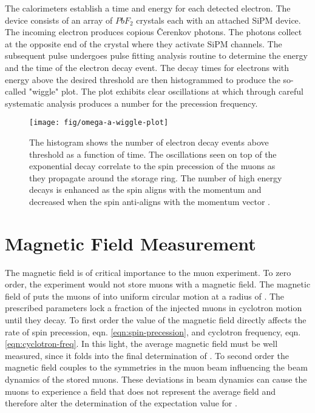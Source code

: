 The calorimeters establish a time and energy for each detected electron.  The device consists of an array of $PbF_2$ crystals each with an attached SiPM device.  The incoming electron produces copious \v{C}erenkov photons.  The photons collect at the opposite end of the crystal where they activate SiPM channels.  The subsequent pulse undergoes pulse fitting analysis routine to determine the energy and the time of the electron decay event.  The decay times for electrons with energy above the desired threshold are then histogrammed to produce the so-called "wiggle" plot.  The plot exhibits clear oscillations at \wa which through careful systematic analysis produces a number for the precession frequency.


\begin{figure}
\label{fig:omega-a-wiggle-plot}
\texttt{[image: fig/omega-a-wiggle-plot]}
\caption{The histogram shows the number of electron decay events above threshold as a function of time.  The oscillations seen on top of the exponential decay correlate to the spin precession of the muons as they propagate around the storage ring.  The number of high energy decays is enhanced as the spin aligns with the momentum and decreased when the spin anti-aligns with the momentum vector .}
\end{figure}

\section{Magnetic Field Measurement}

The magnetic field is of critical importance to the muon \gmtwo experiment. To zero order, the experiment would not store muons with a magnetic field.  The magnetic field of \bmagic puts the muons of \rmagic into uniform circular motion at a radius of \pmagic.  The prescribed parameters lock a fraction of the injected muons in cyclotron motion until they decay.  To first order the value of the magnetic field directly affects the rate of spin precession, eqn. \ref{eqn:spin-precession}, and cyclotron frequency, eqn. \ref{eqn:cyclotron-freq}.  In this light, the average magnetic field must be well measured, since it folds into the final determination of \wa.  To second order the magnetic field couples to the symmetries in the muon beam influencing the beam dynamics of the stored muons.  These deviations in beam dynamics can cause the muons to experience a field that does not represent the average field and therefore alter the determination of the expectation value for \wa.


